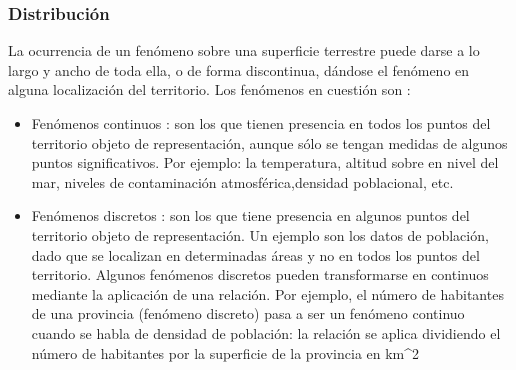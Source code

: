 \subsubsection{Distribución}
La ocurrencia de un fenómeno sobre una superficie terrestre puede darse a lo largo y ancho de toda ella, o de forma 
discontinua, dándose el fenómeno en alguna localización del territorio. Los fenómenos en cuestión son :

\begin{itemize}
    \item Fenómenos continuos :  son los que tienen presencia en todos los puntos del territorio objeto de 
    representación, aunque sólo se tengan medidas de algunos puntos significativos. Por ejemplo: la temperatura,
    altitud sobre en nivel del mar, niveles de contaminación atmosférica,densidad poblacional, etc.
    
    \item Fenómenos discretos : son los que tiene presencia en algunos puntos del territorio objeto de 
    representación. Un ejemplo son los datos de población, dado que se localizan en determinadas áreas y 
    no en todos los puntos del territorio. Algunos fenómenos discretos pueden transformarse en continuos mediante 
    la aplicación de una relación. Por ejemplo, el número de habitantes de una provincia (fenómeno discreto) pasa a 
    ser un fenómeno continuo cuando se habla de densidad de población: la relación se aplica dividiendo el número 
    de habitantes por la superficie de la provincia en km^2
\end{itemize}

